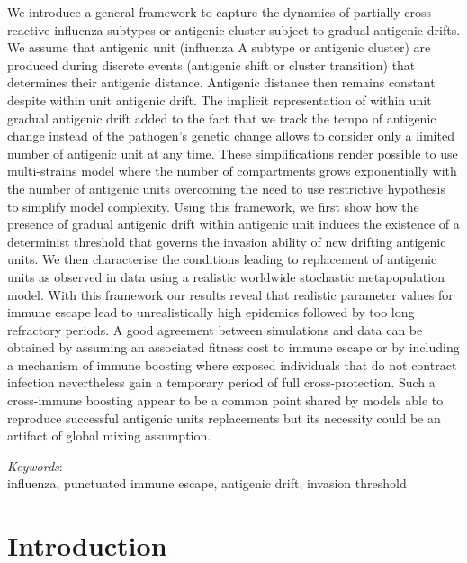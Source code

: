 We introduce a general framework to capture the dynamics of partially
cross reactive influenza subtypes or antigenic cluster subject to
gradual antigenic drifts. We assume that antigenic unit (influenza A
subtype or antigenic cluster) are produced during discrete events
(antigenic shift or cluster transition) that determines their
antigenic distance. Antigenic distance then remains constant despite
within unit antigenic drift. The implicit representation of within
unit gradual antigenic drift added to the fact that we track the tempo
of antigenic change instead of the pathogen's genetic change allows to
consider only a limited number of antigenic unit at any time. These
simplifications render possible to use multi-strains model where the
number of compartments grows exponentially with the number of
antigenic units overcoming the need to use restrictive hypothesis to
simplify model complexity. Using this framework, we first show how the
presence of gradual antigenic drift within antigenic unit induces the
existence of a determinist threshold that governs the invasion ability
of new drifting antigenic units. We then characterise the conditions
leading to replacement of antigenic units as observed in data using a
realistic worldwide stochastic metapopulation model.
%
With this framework our results reveal that realistic parameter values
for immune escape lead to unrealistically high epidemics followed by
too long refractory periods.  
%
A good agreement between simulations and data can be obtained by
assuming an associated fitness cost to immune escape or by including a
mechanism of immune boosting where exposed individuals that do not
contract infection nevertheless gain a temporary period of full
cross-protection.
%
Such a cross-immune boosting appear to be a common point shared by
models able to reproduce successful antigenic units replacements but
its necessity could be an artifact of global mixing assumption.

\vspace{2cm}


\textit{Keywords}: \\
influenza, punctuated immune escape, antigenic drift, invasion threshold


\section{Introduction}

